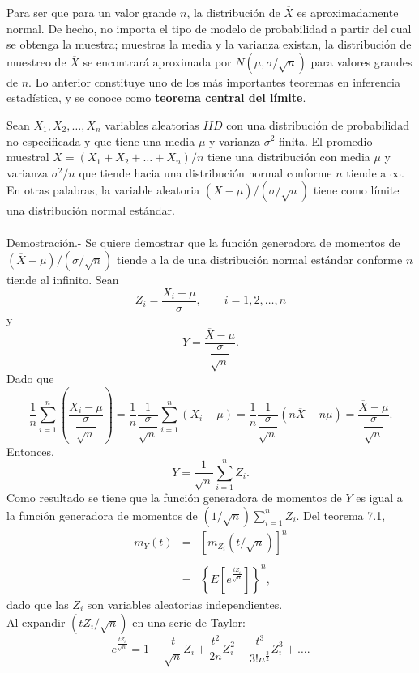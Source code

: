 Para ser que para un valor grande $n$, la distribución de $\overline{X}$ es aproximadamente normal. De hecho, no importa el tipo de modelo de probabilidad a partir del cual se obtenga la muestra; muestras la media y la varianza existan, la distribución de muestreo de $\overline{X}$ se encontrará aproximada por $N\left(\mu, \sigma/\sqrt{n}\right)$ para valores grandes de $n$. Lo anterior constituye uno de los más importantes teoremas en inferencia estadística, y se conoce como \textbf{teorema central del límite}.

\begin{teo}
    Sean $X_1,X_2,\ldots , X_n$ variables aleatorias $IID$ con una distribución de probabilidad no especificada y que tiene una media $\mu$ y varianza $\sigma^2$ finita. El promedio muestral $\overline{X}=\left(X_1+X_2+\ldots + X_n\right)/n$ tiene una distribución con media $\mu$ y varianza $\sigma^2/n$ que tiende hacia una distribución normal conforme $n$ tiende a $\infty$. En otras palabras, la variable aleatoria $(\overline{X}-\mu)/(\sigma/\sqrt{n})$ tiene como límite una distribución normal estándar.\\\\
    Demostración.-\; Se quiere demostrar que la función generadora de momentos de $(\overline{X}-\mu)/(\sigma/\sqrt{n})$ tiende a la de una distribución normal estándar conforme $n$ tiende al infinito. Sean
    $$Z_i=\dfrac{X_i-\mu}{\sigma},\qquad i=1,2,\ldots,n$$
    y
    $$Y=\dfrac{\overline{X}-\mu}{\dfrac{\sigma}{\sqrt{n}}}.$$
    Dado que 
    $$\dfrac{1}{n}\sum_{i=1}^n \left(\dfrac{X_i-\mu}{\dfrac{\sigma}{\sqrt{n}}}\right)=\dfrac{1}{n}\dfrac{1}{\dfrac{\sigma}{\sqrt{n}}}\sum_{i=1}^n (X_i-\mu)=\dfrac{1}{n}\dfrac{1}{\dfrac{\sigma}{\sqrt{n}}}(n\overline{X}-n\mu)=\dfrac{\overline{X}-\mu}{\dfrac{\sigma}{\sqrt{n}}}.$$
    Entonces,
    $$Y=\dfrac{1}{\sqrt{n}}\sum_{i=1}^n Z_i.$$
    Como resultado se tiene que la función generadora de momentos de $Y$ es igual a la función generadora de momentos de $(1/\sqrt{n})\sum_{i=1}^n Z_i$. Del teorema 7.1,
    $$
    \begin{array}{rcl}
	m_Y(t)&=&\left[m_{Z_i}(t/\sqrt{n})\right]^n\\\\
	      &=& \left\{E\left[e^{\frac{tZ_i}{\sqrt{n}}}\right]\right\}^n,
    \end{array}
    $$
    dado que las $Z_i$ son variables aleatorias independientes.\\
    Al expandir $(tZ_i/\sqrt{n})$ en una serie de Taylor:
    $$e^{\frac{tZ_i}{\sqrt{n}}}=1+\dfrac{t}{\sqrt{n}}Z_i + \dfrac{t^2}{2n}Z_i^2 + \dfrac{t^3}{3!n^{\frac{3}{2}}}Z_i^3 + \ldots .$$

\end{teo}
